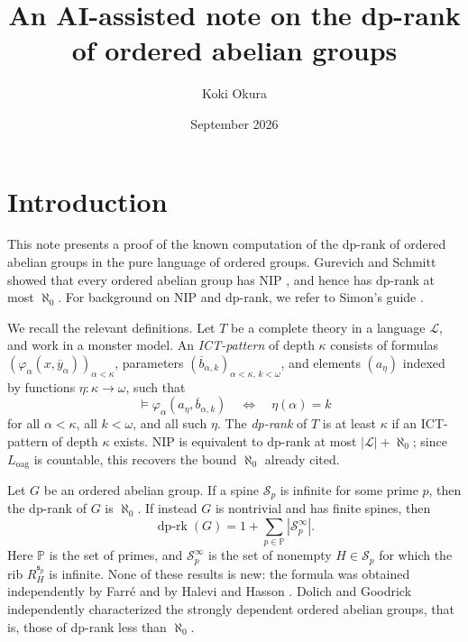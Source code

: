 \documentclass{article}
\title{An AI-assisted note on the dp-rank of ordered abelian groups}
\author{Koki Okura}
\date{September 2026}
\theoremstyle{definition}
\theoremstyle{remark}
\theoremstyle{plain}
\begin{document}
\maketitle

\tableofcontents

\section*{Introduction}

This note presents a proof of the known computation of the dp-rank of ordered abelian groups in the pure language of ordered groups.
Gurevich and Schmitt showed that every ordered abelian group has NIP \cite{Gurevich1984TheOrd}, and hence has dp-rank at most $\aleph_0$.
For background on NIP and dp-rank, we refer to Simon's guide \cite{Simon2015GuiNIP}.

We recall the relevant definitions.
Let $T$ be a complete theory in a language $\mathcal{L}$, and work in a monster model.
An \emph{ICT-pattern} of depth $\kappa$ consists of formulas $(\varphi_{\alpha}(x,\overline{y}_{\alpha}))_{\alpha<\kappa}$, parameters $(\overline{b}_{\alpha,k})_{\alpha<\kappa,\,k<\omega}$, and elements $(a_{\eta})$ indexed by functions $\eta:\kappa\to\omega$, such that
\[
	\models
	\varphi_{\alpha}(a_{\eta},\overline{b}_{\alpha,k})
	\quad\Longleftrightarrow\quad
	\eta(\alpha)=k
\]
for all $\alpha<\kappa$, all $k<\omega$, and all such $\eta$.
The \emph{dp-rank} of $T$ is at least $\kappa$ if an ICT-pattern of depth $\kappa$ exists.
NIP is equivalent to dp-rank at most $|\mathcal{L}|+\aleph_0$; since $L_{\mathrm{oag}}$ is countable, this recovers the bound $\aleph_0$ already cited.

Let $G$ be an ordered abelian group.
If a spine $\mathcal{S}_p$ is infinite for some prime $p$, then the dp-rank of $G$ is $\aleph_0$.
If instead $G$ is nontrivial and has finite spines, then
\[
	\operatorname{dp\text{-}rk}(G)
	=
	1+\sum_{p\in\mathbb{P}}\left|\mathcal{S}_p^\infty\right|.
\]
Here $\mathbb{P}$ is the set of primes, and $\mathcal{S}_p^\infty$ is the set of nonempty $H\in\mathcal{S}_p$ for which the rib $R_H^{\mathfrak{s}_p}$ is infinite.
None of these results is new: the formula was obtained independently by Farré \cite{Farre2017StrOrd} and by Halevi and Hasson \cite{Halevi2019StrDep}.
Dolich and Goodrick \cite{Dolich2018ChaStr} independently characterized the strongly dependent ordered abelian groups, that is, those of dp-rank less than $\aleph_0$.
\end{document}
